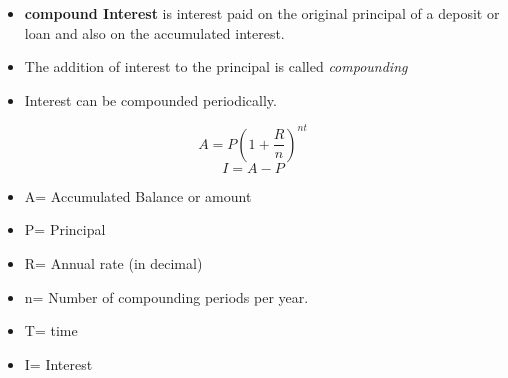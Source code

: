 \documentclass{article}
\begin{document}
	\begin{itemize}
		\item \textbf{compound Interest} is interest paid on the original principal of a deposit or loan and also on the accumulated interest.
		\item The addition of interest to the principal is called \emph{compounding}
		\item Interest can be compounded periodically.
	\end{itemize}
		\begin{equation}
		A = P(1 + \frac{R}{n})^{nt}
		\end{equation}
		\begin{equation}
		I = A - P
		\end{equation}
	\begin{itemize}
		\item A= Accumulated Balance or amount
		\item P= Principal
		\item R= Annual rate (in decimal)
		\item n= Number of compounding periods per year.
		\item T= time 
		\item I= Interest
	\end{itemize}
	
\end{document}
